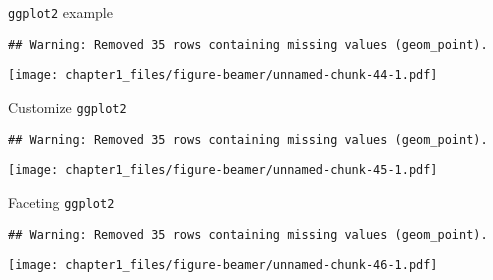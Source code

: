 \begin{frame}[fragile]{\texttt{ggplot2} example}
\protect\hypertarget{ggplot2-example-2}{}

\begin{Shaded}
\begin{Highlighting}[]
\OperatorTok{+}\StringTok{ }\NormalTok{(}\NormalTok{(}
\end{Highlighting}
\end{Shaded}

\begin{verbatim}
## Warning: Removed 35 rows containing missing values (geom_point).
\end{verbatim}

\texttt{[image: chapter1\_files/figure-beamer/unnamed-chunk-44-1.pdf]}

\end{frame}

\begin{frame}[fragile]{Customize \texttt{ggplot2}}
\protect\hypertarget{customize-ggplot2}{}

\begin{Shaded}
\begin{Highlighting}[]
\OperatorTok{+}\StringTok{ }
\StringTok{  }\NormalTok{(}\NormalTok{(}\OperatorTok{+}\StringTok{ }
\StringTok{  }\NormalTok{(} \NormalTok{, } \NormalTok{)}
\end{Highlighting}
\end{Shaded}

\begin{verbatim}
## Warning: Removed 35 rows containing missing values (geom_point).
\end{verbatim}

\texttt{[image: chapter1\_files/figure-beamer/unnamed-chunk-45-1.pdf]}

\end{frame}

\begin{frame}[fragile]{Faceting \texttt{ggplot2}}
\protect\hypertarget{faceting-ggplot2}{}

\begin{verbatim}
## Warning: Removed 35 rows containing missing values (geom_point).
\end{verbatim}

\texttt{[image: chapter1\_files/figure-beamer/unnamed-chunk-46-1.pdf]}

\end{frame}

